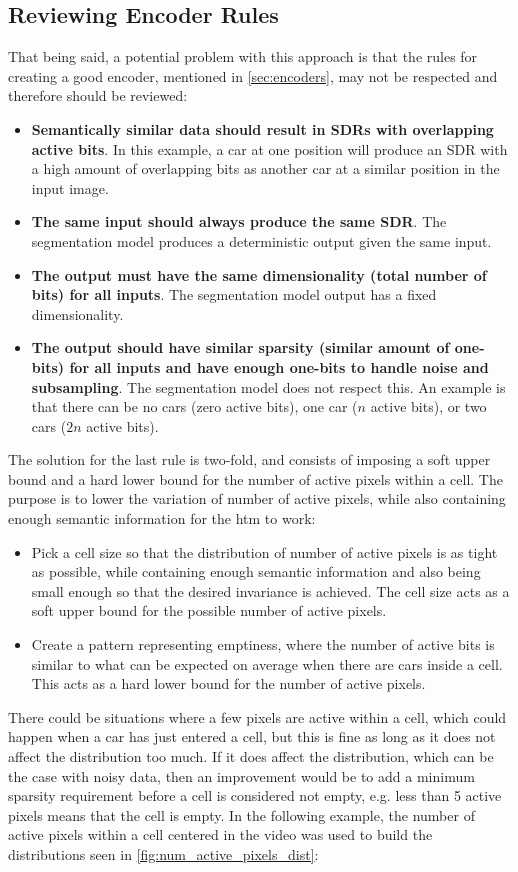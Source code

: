 \subsection{Reviewing Encoder Rules}
That being said, a potential problem with this approach is that the rules for creating a good encoder, mentioned in \autoref{sec:encoders}, may not be respected and therefore should be reviewed:
\begin{itemize}
    \item \textbf{Semantically similar data should result in SDRs with overlapping active bits}. In this example, a car at one position will produce an SDR with a high amount of overlapping bits as another car at a similar position in the input image.
    \item \textbf{The same input should always produce the same SDR}. The segmentation model produces a deterministic output given the same input.
    \item \textbf{The output must have the same dimensionality (total number of bits) for all inputs}. The segmentation model output has a fixed dimensionality.
    \item \textbf{The output should have similar sparsity (similar amount of one-bits) for all inputs and have enough one-bits to handle noise and subsampling}. The segmentation model does not respect this. An example is that there can be no cars (zero active bits), one car ($n$ active bits), or two cars ($2n$ active bits).
\end{itemize}
The solution for the last rule is two-fold, and  consists of imposing a soft upper bound and a hard lower bound for the number of active pixels within a cell. The purpose is to lower the variation of number of active pixels, while also containing enough semantic information for the \gls*{htm} to work:
\begin{itemize}
    \item Pick a cell size so that the distribution of number of active pixels is as tight as possible, while containing enough semantic information and also being small enough so that the desired invariance is achieved. The cell size acts as a soft upper bound for the possible number of active pixels.
    \item Create a pattern representing emptiness, where the number of active bits is similar to what can be expected on average when there are cars inside a cell. This acts as a hard lower bound for the number of active pixels.
\end{itemize}
There could be situations where a few pixels are active within a cell, which could happen when a car has just entered a cell, but this is fine as long as it does not affect the distribution too much. If it does affect the distribution, which can be the case with noisy data, then an improvement would be to add a minimum sparsity requirement before a cell is considered not empty, e.g. less than 5 active pixels means that the cell is empty.  In the following example, the number of active pixels within a cell centered in the video was used to build the distributions seen in \autoref{fig:num_active_pixels_dist}:
